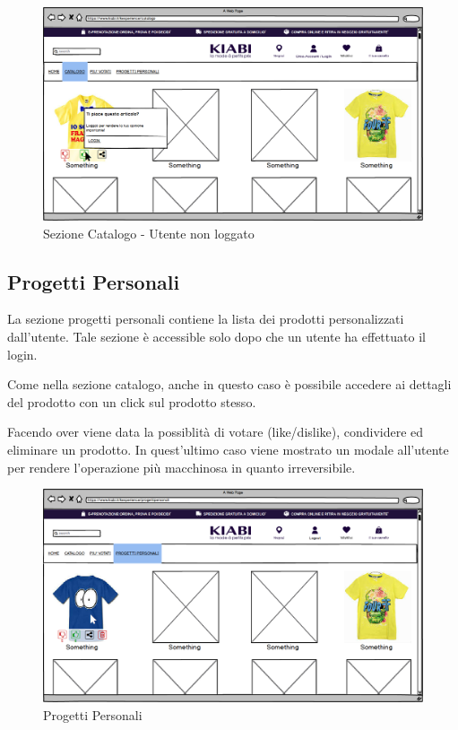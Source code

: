 \documentclass[12pt,italian,]{report}
\begin{document}
\begin{figure}[h]
\centering
\includegraphics{balsamiq/Catalogo login.png}
\caption{Sezione Catalogo - Utente non loggato}
\label{catalogo_non_loggato}
\end{figure}
\clearpage

\newpage
\subsection{Progetti Personali} 

La sezione progetti personali contiene la lista dei prodotti personalizzati dall'utente. Tale sezione è accessible solo dopo che un utente ha effettuato il login.

Come nella sezione catalogo, anche in questo caso è possibile accedere ai dettagli del prodotto con un click sul prodotto stesso.

Facendo over viene data la possiblità di votare (like/dislike), condividere ed eliminare un prodotto. In quest'ultimo caso viene mostrato un modale all'utente per rendere l'operazione più macchinosa in quanto irreversibile.

\begin{figure}[h]
\centering
\includegraphics{balsamiq/Progetti Personali.png}
\caption{Progetti Personali}
\label{progetti_personali}
\end{figure}
\end{document}
